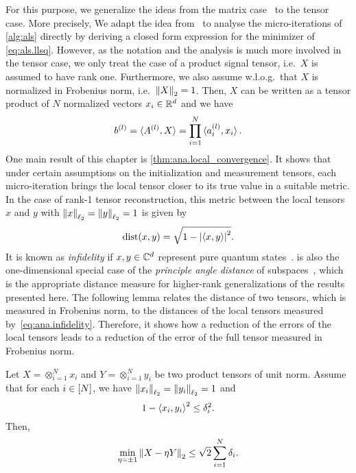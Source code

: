 For this purpose, we generalize the ideas from the matrix case~\cite{Zhong_2015_Efficient} to the tensor case.
More precisely, We adapt the idea from~\cite{Zhong_2015_Efficient} to analyse the micro-iterations of \cref{alg:als} directly by deriving a closed form expression for the minimizer of \cref{eq:als.llsq}.
However, as the notation and the analysis is much more involved in the tensor case, we only treat the case of a product signal tensor, i.e.\ $X$ is assumed to have rank one.
Furthermore, we also assume w.l.o.g.\ that $X$ is normalized in Frobenius norm, i.e.\ ${\Vert X\Vert}_2 = 1$.
Then, $X$ can be written as a tensor product of $N$ normalized vectors $x_i \in {\mathbb{R}}^d$ and we have
\[
  b^{(l)} = \braket{A^{(l)}, X} = \prod_{i=1}^N \braket{a^{(l)}_i, x_i}.
  \label{eq:ana.b_as_product}
\]
One main result of this chapter is \cref{thm:ana.local_convergence}.
It shows that under certain assumptions on the initialization and measurement tensors, each micro-iteration brings the local tensor closer to its true value in a suitable metric.
In the case of rank-1 tensor reconstruction, this metric between the local tensors $x$ and $y$ with ${\Vert x\Vert}_{\ell_2} = {\Vert y\Vert}_{\ell_2} = 1$ is given by
\[
  \mathrm{dist}(x, y) = \sqrt{1 - {\left\vert\braket{x, y}\right\vert}^2}.
  \label{eq:ana.infidelity}
\]
It is known as \emph{infidelity} if $x, y \in {\mathbb{C}}^d$ represent pure quantum states~\cite{Nielsen_2010_Quantum}.
 is also the one-dimensional special case of the \emph{principle angle distance} of subspaces~\cite{Golub_2013_Matrix}, which is the appropriate distance measure for higher-rank generalizations of the results presented here.
The following lemma relates the  distance of two tensors, which is measured in Frobenius norm, to the distances of the local tensors measured by~\eqref{eq:ana.infidelity}.
Therefore, it shows how a reduction of the errors of the local tensors leads to a reduction of the error of the full tensor measured in Frobenius norm.
\begin{lemma}%
  \label{lem:ana.local_global_closeness}
  Let $X = \otimes_{i=1}^N x_i$ and $Y = \otimes_{i=1}^N y_i$ be two product tensors of unit norm.
  Assume that for each $i \in [N]$, we have ${\Vert x_i\Vert}_{\ell_2} = {\Vert y_i\Vert}_{\ell_2} = 1$ and
  \[
    \label{eq:ana.local_global_closeness.local_close}
    1 - \Braket{x_i, y_i}^2 \le \delta_i^2.
  \]
  Then,
  \[
    \min_{\eta = \pm 1} {\left\Vert X - \eta Y\right\Vert}_{2} \le \sqrt{2} \sum_{i=1}^N \delta_i.
  \]
\end{lemma}
